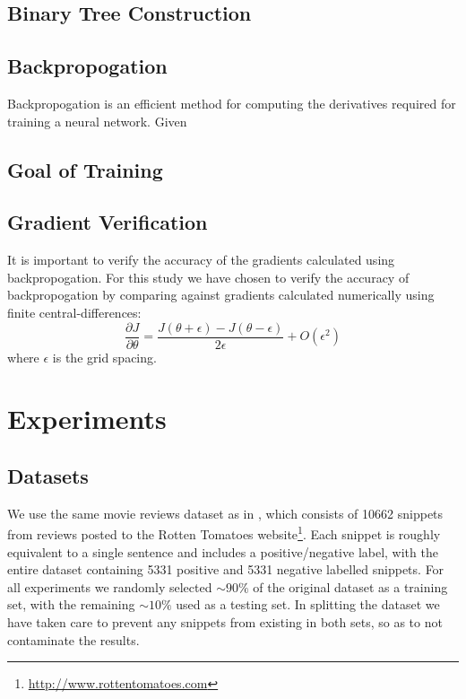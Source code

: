 \documentclass{article}
\begin{document}
\subsection{Binary Tree Construction}


\subsection{Backpropogation}
Backpropogation is an efficient method for computing the derivatives required for training a neural network. Given



\subsection{Goal of Training}


\subsection{Gradient Verification}
It is important to verify the accuracy of the gradients calculated using backpropogation. For this study we have chosen to verify the accuracy of backpropogation by comparing against gradients calculated numerically using finite central-differences:
\begin{equation}
    \frac{\partial J}{\partial \theta} = \frac{J(\theta + \epsilon) - J(\theta - \epsilon)}{2\epsilon} + O(\epsilon ^2)
\end{equation}
where $\epsilon$ is the grid spacing.



\section{Experiments}

%
%
\subsection{Datasets}
We use the same movie reviews dataset as in \cite{Socher}, which consists of 10662 snippets from reviews posted to the Rotten Tomatoes website\footnote{\url{http://www.rottentomatoes.com}}. Each snippet is roughly equivalent to a single sentence and includes a positive/negative label, with the entire dataset containing 5331 positive and 5331 negative labelled snippets. For all experiments we randomly selected $\sim 90\%$ of the original dataset as a training set, with the remaining $\sim 10\%$ used as a testing set. In splitting the dataset we have taken care to prevent any snippets from existing in both sets, so as to not contaminate the results.
\end{document}
